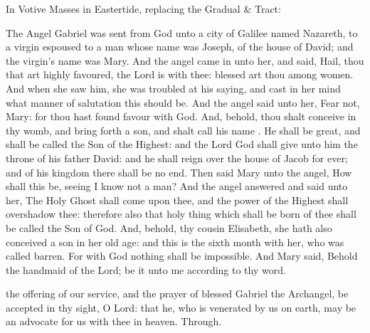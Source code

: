 \lesseralleluianotice


\begin{rubric}
	In Votive Masses in Eastertide, replacing the Gradual \& Tract:
\end{rubric}


 The Angel Gabriel was sent from God unto a city of Galilee named Nazareth, to a virgin espoused to a man whose name was Joseph, of the house of David; and the virgin's name was Mary. And the angel came in unto her, and said, Hail, thou that art highly favoured, the Lord is with thee: blessed art thou among women. And when she saw him, she was troubled at his saying, and cast in her mind what manner of salutation this should be. And the angel said unto her, Fear not, Mary: for thou hast found favour with God. And, behold, thou shalt conceive in thy womb, and bring forth a son, and shalt call his name . He shall be great, and shall be called the Son of the Highest: and the Lord God shall give unto him the throne of his father David: and he shall reign over the house of Jacob for ever; and of his kingdom there shall be no end. Then said Mary unto the angel, How shall this be, seeing I know not a man? And the angel answered and said unto her, The Holy Ghost shall come upon thee, and the power of the Highest shall overshadow thee: therefore also that holy thing which shall be born of thee shall be called the Son of God. And, behold, thy cousin Elisabeth, she hath also conceived a son in her old age: and this is the sixth month with her, who was called barren. For with God nothing shall be impossible. And Mary said, Behold the handmaid of the Lord; be it unto me according to thy word.


\secret
{} the offering of our service, and the prayer of blessed Gabriel the Archangel, be accepted in thy sight, O Lord: that he, who is venerated by us on earth, may be an advocate for us with thee in heaven. Through.


